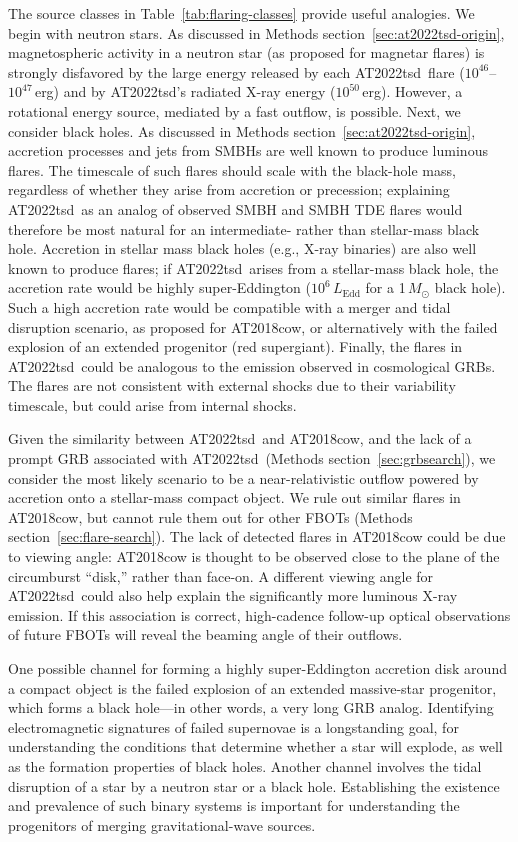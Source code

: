\documentclass{nature_plusfigure}
\newcommand{\at}{AT2022tsd}
\begin{document}
The source classes in Table~\ref{tab:flaring-classes} provide useful analogies. We begin with neutron stars. As discussed in Methods section~\ref{sec:at2022tsd-origin}, magnetospheric activity in a neutron star (as proposed for magnetar flares) is strongly disfavored by the large energy released by each \at\ flare ($10^{46}$--$10^{47}$\,erg) and by \at's radiated X-ray energy ($10^{50}$\,erg).
However, a rotational energy source, mediated by a fast outflow, is possible.
Next, we consider black holes. As discussed in Methods section~\ref{sec:at2022tsd-origin}, accretion processes and jets from SMBHs are well known to produce luminous flares. The timescale of such flares should scale with the black-hole mass, regardless of whether they arise from accretion or precession; explaining \at\ as an analog of observed SMBH and SMBH TDE flares would therefore be most natural for an intermediate- rather than stellar-mass black hole.
Accretion in stellar mass black holes (e.g., X-ray binaries) are also well known to produce flares; if \at\ arises from a stellar-mass black hole, the accretion rate would be highly super-Eddington ($10^{6}\,L_\mathrm{Edd}$ for a 1\,$M_\odot$ black hole). Such a high accretion rate would be compatible with a merger and tidal disruption scenario, as proposed for AT2018cow\cite{Metzger2022}, or alternatively with the failed explosion of an extended progenitor\cite{Quataert2012} (red supergiant).
Finally, the flares in \at\ could be analogous to the emission observed in cosmological GRBs. The flares are not consistent with external shocks due to their variability timescale, but could arise from internal shocks.

Given the similarity between \at\ and AT2018cow, and the lack of a prompt GRB associated with \at\ (Methods section~\ref{sec:grbsearch}), we consider the most likely scenario to be a near-relativistic outflow powered by accretion onto a stellar-mass compact object.
We rule out similar flares in AT2018cow, but cannot rule them out for other FBOTs (Methods section~\ref{sec:flare-search}).
The lack of detected flares in AT2018cow could be due to viewing angle: AT2018cow is thought to be observed close to the plane of the circumburst ``disk,'' rather than face-on\cite{Margutti2019,Chen2023}. A different viewing angle for \at\ could also help explain the significantly more luminous X-ray emission.
If this association is correct, high-cadence follow-up optical observations of future FBOTs will reveal the beaming angle of their outflows.

One possible channel for forming a highly super-Eddington accretion disk around a compact object is the failed explosion of an extended massive-star progenitor, which forms a black hole\cite{Woosley1993,Quataert2019}---in other words, a very long GRB analog\cite{Quataert2012}.
Identifying electromagnetic signatures of failed supernovae is a longstanding goal, for understanding the conditions that determine whether a star will explode, as well as the formation properties of black holes.
Another channel involves the tidal disruption of a star by a neutron star or a black hole\cite{Metzger2022}.
Establishing the existence and prevalence of such binary systems is important for understanding the progenitors of merging gravitational-wave sources.
\end{document}
